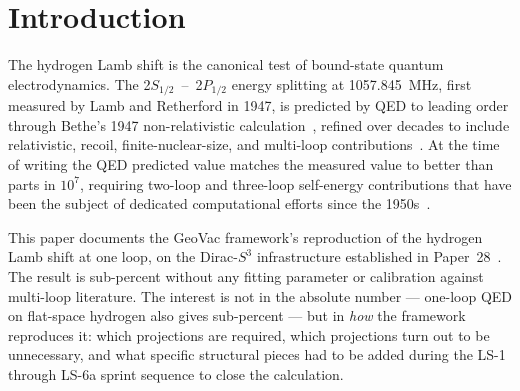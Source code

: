 \documentclass[11pt]{article}
\begin{document}
\begin{abstract}
The structural reading is sharper than the numerical agreement.  The
framework's bound-state QED machinery is built from three projections
that each have a literature precedent: the Camporesi--Higuchi spinor
lift on $S^3$ (Paper~28), the Coulomb Sturmian basis at exponent
$\lambda = Z/n$ (which the LS-2 sprint identified as the Fock graph
re-parameterized for bound-state space; Paper~7), and the
Drake--Swainson asymptotic-subtraction projection (Paper~34
\S\,III.13).  The standard Eides~\S\,3.2 one-loop convention sits on
top.  No GeoVac-specific fitting parameter enters; the framework
reproduces the hydrogen Lamb shift at one loop because the bare
combinatorial graph is right and the projections that turn it into a
physical observable are standard.
\end{abstract}

\section{Introduction}
\label{sec:intro}

The hydrogen Lamb shift is the canonical test of bound-state quantum
electrodynamics.  The 2$S_{1/2}$~--~2$P_{1/2}$ energy splitting at
1057.845~MHz, first measured by Lamb and Retherford in 1947, is
predicted by QED to leading order through Bethe's 1947 non-relativistic
calculation~\cite{bethe1947}, refined over decades to include
relativistic, recoil, finite-nuclear-size, and multi-loop
contributions~\cite{eides2001}.  At the time of writing the QED
predicted value matches the measured value to better than parts in
$10^7$, requiring two-loop and three-loop self-energy contributions
that have been the subject of dedicated computational efforts since
the 1950s~\cite{mohr_plunien_soff}.

This paper documents the GeoVac framework's reproduction of the
hydrogen Lamb shift at one loop, on the Dirac-$S^3$ infrastructure
established in Paper~28~\cite{paper28}.  The result is sub-percent
without any fitting parameter or calibration against multi-loop
literature.  The interest is not in the absolute number --- one-loop
QED on flat-space hydrogen also gives sub-percent --- but in
\emph{how} the framework reproduces it: which projections are
required, which projections turn out to be unnecessary, and what
specific structural pieces had to be added during the LS-1 through
LS-6a sprint sequence to close the calculation.
\end{document}
